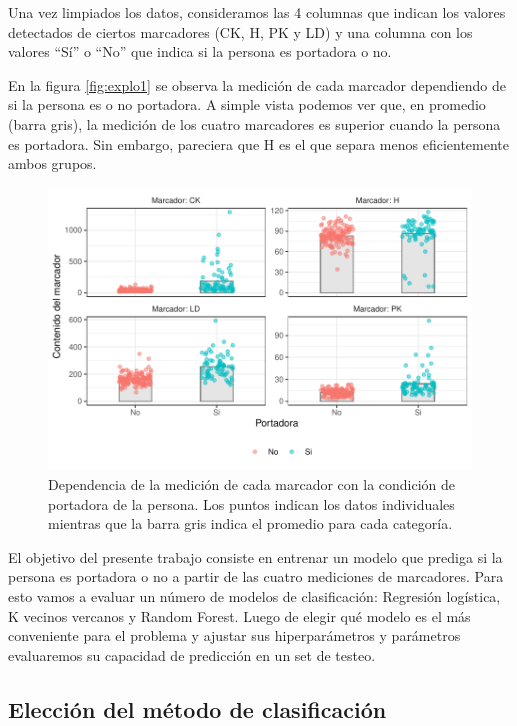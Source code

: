 \documentclass[
]{article}
\begin{document}
Una vez limpiados los datos, consideramos las 4 columnas que indican los
valores detectados de ciertos marcadores (CK, H, PK y LD) y una columna
con los valores ``Sí'' o ``No'' que indica si la persona es portadora o
no.

En la figura \ref{fig:explo1} se observa la medición de cada marcador
dependiendo de si la persona es o no portadora. A simple vista podemos
ver que, en promedio (barra gris), la medición de los cuatro marcadores
es superior cuando la persona es portadora. Sin embargo, pareciera que H
es el que separa menos eficientemente ambos grupos.

\begin{figure}[H]

{\centering \includegraphics{Charaf-Spiousas_Clasificacion0_files/figure-latex/unnamed-chunk-3-1} 

}

\caption{\label{fig:explo1}Dependencia de la medición de cada marcador con la condición de portadora de la persona. Los puntos indican los datos individuales mientras que la barra gris indica el promedio para cada categoría.}\label{fig:unnamed-chunk-3}
\end{figure}

El objetivo del presente trabajo consiste en entrenar un modelo que
prediga si la persona es portadora o no a partir de las cuatro
mediciones de marcadores. Para esto vamos a evaluar un número de modelos
de clasificación: Regresión logística, K vecinos vercanos y Random
Forest. Luego de elegir qué modelo es el más conveniente para el
problema y ajustar sus hiperparámetros y parámetros evaluaremos su
capacidad de predicción en un set de testeo.

\hypertarget{elecciuxf3n-del-muxe9todo-de-clasificaciuxf3n}{%
\subsection{Elección del método de
clasificación}\label{elecciuxf3n-del-muxe9todo-de-clasificaciuxf3n}}
\end{document}
